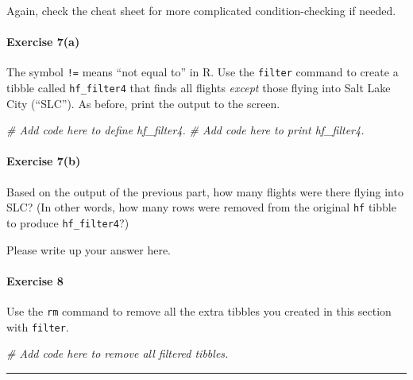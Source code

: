 \documentclass[
]{book}
\newenvironment{Shaded}{\begin{snugshade}}{\end{snugshade}}
\newcommand{\CommentTok}[1]{\textcolor[rgb]{0.56,0.35,0.01}{\textit{#1}}}
\begin{document}
Again, check the cheat sheet for more complicated condition-checking if needed.

\hypertarget{exercise-7a-2}{%
\paragraph*{Exercise 7(a)}\label{exercise-7a-2}}

The symbol \texttt{!=} means ``not equal to'' in R. Use the \texttt{filter} command to create a tibble called \texttt{hf\_filter4} that finds all flights \emph{except} those flying into Salt Lake City (``SLC''). As before, print the output to the screen.

\begin{Shaded}
\begin{Highlighting}[]
\CommentTok{\# Add code here to define hf\_filter4.}
\CommentTok{\# Add code here to print hf\_filter4.}
\end{Highlighting}
\end{Shaded}

\hypertarget{exercise-7b-2}{%
\paragraph*{Exercise 7(b)}\label{exercise-7b-2}}

Based on the output of the previous part, how many flights were there flying into SLC? (In other words, how many rows were removed from the original \texttt{hf} tibble to produce \texttt{hf\_filter4}?)

Please write up your answer here.

\hypertarget{exercise-8-1}{%
\paragraph*{Exercise 8}\label{exercise-8-1}}

Use the \texttt{rm} command to remove all the extra tibbles you created in this section with \texttt{filter}.

\begin{Shaded}
\begin{Highlighting}[]
\CommentTok{\# Add code here to remove all filtered tibbles.}
\end{Highlighting}
\end{Shaded}

\begin{center}\rule{0.5\linewidth}{0.5pt}\end{center}
\end{document}
